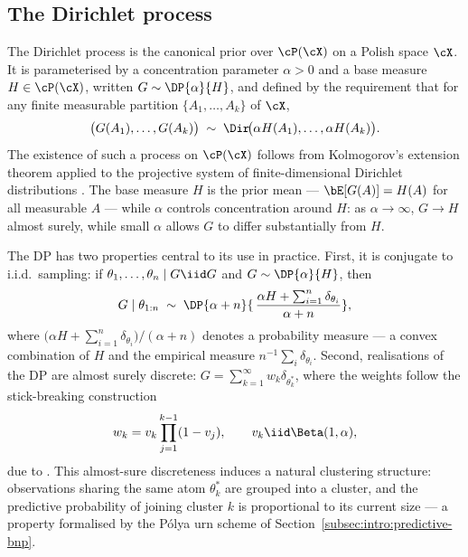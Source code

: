 \subsection{The Dirichlet process}
\label{subsec:intro:dp}

The Dirichlet process \citep{Ferguson1973} is the canonical prior over
$\cP(\cX)$ on a Polish space $\cX$.  It is parameterised by a
concentration parameter $\alpha > 0$ and a base measure $H \in \cP(\cX)$,
written $G \sim \DP{\alpha}{H}$, and defined by the requirement that for
any finite measurable partition $\{A_1, \ldots, A_k\}$ of $\cX$,
\begin{equation}
  \bigl(G(A_1), \ldots, G(A_k)\bigr)
  \;\sim\;
  \Dir\!\bigl(\alpha H(A_1), \ldots, \alpha H(A_k)\bigr).
  \label{eq:dp-def}
\end{equation}
The existence of such a process on $\cP(\cX)$ follows from Kolmogorov's
extension theorem applied to the projective system of finite-dimensional
Dirichlet distributions \citep[Theorem~1]{Ferguson1973}.  The base measure
$H$ is the prior mean --- $\bE[G(A)] = H(A)$ for all measurable $A$ ---
while $\alpha$ controls concentration around $H$: as $\alpha \to \infty$,
$G \to H$ almost surely, while small $\alpha$ allows $G$ to differ
substantially from $H$.

The DP has two properties central to its use in practice.  First, it is
conjugate to i.i.d.\ sampling: if $\theta_1, \ldots, \theta_n \mid G \iid
G$ and $G \sim \DP{\alpha}{H}$, then
\begin{equation}
  G \mid \theta_{1:n}
  \;\sim\;
  \DP{\alpha + n}{\,\dfrac{\alpha H + \sum_{i=1}^{n} \delta_{\theta_i}}{\alpha + n}},
  \label{eq:dp-posterior}
\end{equation}
where $\bigl(\alpha H + \sum_{i=1}^n \delta_{\theta_i}\bigr)/(\alpha+n)$
denotes a probability measure --- a convex combination of $H$ and the
empirical measure $n^{-1}\sum_i \delta_{\theta_i}$.  Second, realisations
of the DP are almost surely discrete: $G = \sum_{k=1}^\infty w_k
\delta_{\theta_k^*}$, where the weights follow the stick-breaking
construction
\begin{equation}
  w_k = v_k \prod_{j=1}^{k-1}(1 - v_j),
  \qquad
  v_k \iid \Beta(1, \alpha),
  \label{eq:stick-breaking}
\end{equation}
due to \citet{Sethuraman1994}.  This almost-sure discreteness induces a
natural clustering structure: observations sharing the same atom
$\theta_k^*$ are grouped into a cluster, and the predictive probability of
joining cluster $k$ is proportional to its current size --- a property
formalised by the P\'{o}lya urn scheme of
Section~\ref{subsec:intro:predictive-bnp}.

